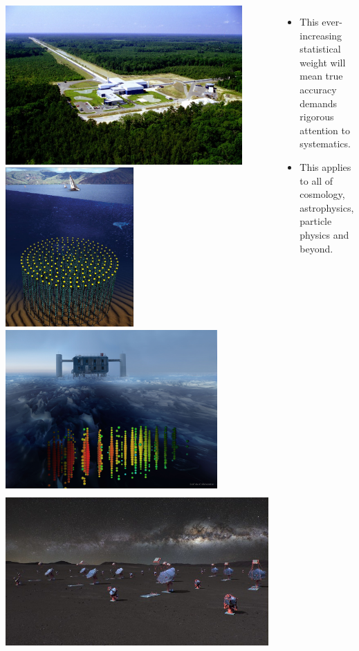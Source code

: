 \documentclass[aspectratio=169]{beamer}
\begin{document}
\begin{frame}
\begin{columns}
        \includegraphics[height=0.18428\textwidth]{figures/telescopes/ligo.jpg}%
        \includegraphics[height=0.18428\textwidth]{figures/telescopes/km3n.jpg}%
        \includegraphics[height=0.18428\textwidth]{figures/telescopes/icecube.jpg}%
        \includegraphics[height=0.18428\textwidth]{figures/telescopes/CTA.jpg}%

        \begin{itemize}
            \item This ever-increasing statistical weight will mean true accuracy demands rigorous attention to systematics.
            \item This applies to all of cosmology, astrophysics, particle physics and beyond.
        \end{itemize}

    \end{columns}
\end{frame}
\end{document}
